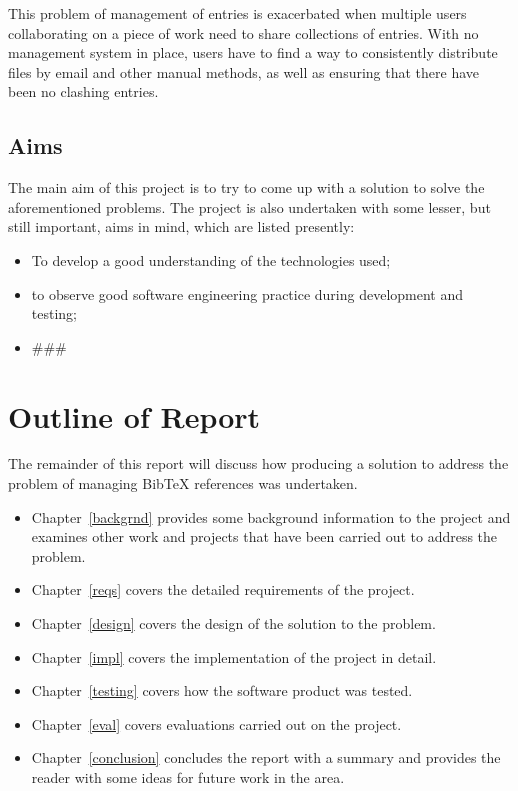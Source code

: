 \documentclass{l4proj}
\newcommand{\BibTeX}{B{\sc ib}\TeX}
\newcommand{\bibtex}{\BibTeX}
\newcommand{\revisit}{\#\#\#}
\begin{document}
This problem of management of entries is exacerbated when multiple users collaborating on a piece of work need to share collections of entries.  With no management system in place, users have to find a way to consistently distribute files by email and other manual methods, as well as ensuring that there have been no clashing entries.

\subsection{Aims}
The main aim of this project is to try to come up with a solution to solve the aforementioned problems.  The project is also undertaken with some lesser, but still important, aims in mind, which are listed presently:
\begin{itemize}
\item To develop a good understanding of the technologies used;
\item to observe good software engineering practice during development and testing;
\item \revisit
\end{itemize}


\section{Outline of Report}
The remainder of this report will discuss how producing a solution to address the problem of managing \bibtex{} references was undertaken. 
\begin{itemize}
\item Chapter~\ref{backgrnd} provides some background information to the project and examines other work and projects that have been carried out to address the problem.
\item Chapter~\ref{reqs} covers the detailed requirements of the project.
\item Chapter~\ref{design} covers the design of the solution to the problem.
\item Chapter~\ref{impl} covers the implementation of the project in detail.
\item Chapter~\ref{testing} covers how the software product was tested.
\item Chapter~\ref{eval} covers evaluations carried out on the project.
\item Chapter~\ref{conclusion} concludes the report with a summary and provides the reader with some ideas for future work in the area.
\end{itemize}
\end{document}
